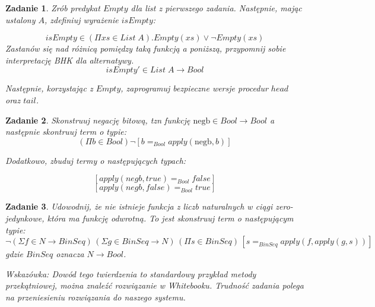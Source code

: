 \documentclass[11pt, a4paper]{article}
\newtheorem{zadanie}{Zadanie}
\begin{document}
\begin{zadanie}
Zrób predykat $Empty$ dla list z pierwszego zadania. Następnie, mając ustalony $A$, zdefiniuj wyrażenie $isEmpty$:

\[
 isEmpty \in (\Pi xs \in List\;A). Empty(xs) \vee \neg Empty(xs)
\]
Zastanów się nad różnicą pomiędzy taką funkcją a poniższą, przypomnij sobie interpretację BHK dla alternatywy.
\[
 isEmpty' \in List\;A \to Bool
\]

Następnie, korzystając z $Empty$, zaprogramuj bezpieczne wersje procedur $head$ oraz $tail$.
\end{zadanie}


\begin{zadanie}
 Skonstruuj negację bitową, tzn funkcję $\mbox{negb} \in Bool \to Bool$ a następnie skontruuj term o typie:
\[
 (\Pi b \in Bool) \neg [b =_{Bool} apply(\mbox{negb},b)]
\]

Dodatkowo, zbuduj termy o następujących typach:

\[
 [apply(negb, true) =_{Bool} false]
\]
\[
 [apply(negb, false) =_{Bool} true]
\]

\end{zadanie}


\begin{zadanie}
 Udowodnij, że nie istnieje funkcja z liczb naturalnych w ciągi zero-jedynkowe, która ma funkcję odwrotną.
To jest skonstruuj
 term o następującym typie:
\[
 \neg (\Sigma f \in N \to BinSeq)\, (\Sigma g \in BinSeq \to N)\,
(\Pi s \in BinSeq)\,[ s =_{BinSeq} apply(f, apply(g, s)) ]
\]
gdzie $BinSeq$ oznacza $N \to Bool$.

Wskazówka: Dowód tego twierdzenia to standardowy przykład metody przekątniowej, można znaleźć rozwiązanie w Whitebooku.
Trudność zadania polega na przeniesieniu rozwiązania do naszego systemu.
\end{zadanie}
\end{document}
